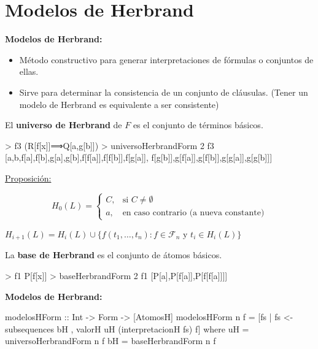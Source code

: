 \documentclass[aspectratio=169]{beamer}
\begin{document}
\section{Modelos de Herbrand}

\begin{frame}
  \textbf{Modelos de Herbrand:}
  \begin{itemize}
  \item Método constructivo para generar interpretaciones de fórmulas o conjuntos de ellas.
  \item Sirve para determinar la consistencia de un conjunto de cláusulas. (Tener un modelo de
    Herbrand es equivalente a ser consistente)
  \end{itemize}
\end{frame}

\begin{frame}[fragile]
  El \textbf{universo de Herbrand} de $F$ es el conjunto de términos básicos.
\begin{sesion}
> f3
(R[f[x]]⟹Q[a,g[b]])
> universoHerbrandForm 2 f3
[a,b,f[a],f[b],g[a],g[b],f[f[a]],f[f[b]],f[g[a]],
f[g[b]],g[f[a]],g[f[b]],g[g[a]],g[g[b]]]
\end{sesion}

\underline{Proposición:}

  \begin{equation*}
    H_0(L)= \left\{
      \begin{array}{ll}
        C, & \text{si } C \neq \emptyset \\
        {a}, & \text{en caso contrario (a nueva constante)} 
      \end{array} \right.
  \end{equation*}
  
 \quad \quad \quad  $H_{i+1}(L) = H_i(L)\cup \{f(t_1,\dots,t_n):f\in \mathcal{F}_n \text{ y } t_i\in H_i (L)\}$

\end{frame}

\begin{frame}[fragile]
La \textbf{base de Herbrand} es el conjunto de átomos básicos.

\begin{sesion}
> f1
P[f[x]]
> baseHerbrandForm 2 f1
[P[a],P[f[a]],P[f[f[a]]]]  
\end{sesion}
\end{frame}

\begin{frame}[fragile]
  \textbf{Modelos de Herbrand:}

  \vspace{5mm}
\begin{code}
modelosHForm :: Int -> Form -> [AtomosH]
modelosHForm n f =
 [fs | fs <- subsequences bH
      , valorH uH (interpretacionH fs) f]
  where uH = universoHerbrandForm n f
        bH = baseHerbrandForm n f
\end{code}  
  
\end{frame}
\end{document}
